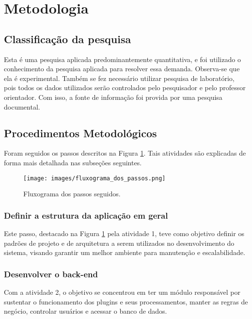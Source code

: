 \documentclass[12pt]{article}
\begin{document}
\section{Metodologia}

\subsection{Classificação da pesquisa}

Esta é uma pesquisa aplicada predominantemente quantitativa, e foi utilizado o conhecimento da pesquisa aplicada para resolver essa demanda. Observa-se que ela é experimental. Também se fez necessário utilizar pesquisa de laboratório, pois todos os dados utilizados serão controlados pelo pesquisador e pelo professor orientador. Com isso, a fonte de informação foi provida por uma pesquisa documental.

\subsection{Procedimentos Metodológicos}

Foram seguidos os passos descritos na Figura \ref{fig:fluxograma}. Tais atividades são explicadas de forma mais detalhada nas subseções seguintes.

\begin{figure}[htb]
\centering
\texttt{[image: images/fluxograma\_dos\_passos.png]}
\caption{Fluxograma dos passos seguidos.}
\label{fig:fluxograma}
\end{figure}

\subsubsection{Definir a estrutura da aplicação em geral}

Este passo, destacado na Figura \ref{fig:fluxograma} pela atividade 1, teve como objetivo definir os padrões de projeto e de arquitetura a serem utilizados no desenvolvimento do sistema, visando garantir um melhor ambiente para manutenção e escalabilidade. 

\subsubsection{Desenvolver o back-end}

Com a atividade 2, o objetivo se concentrou em ter um módulo responsável por sustentar o funcionamento dos plugins e seus processamentos, manter as regras de negócio, controlar usuários e acessar o banco de dados.
\end{document}
